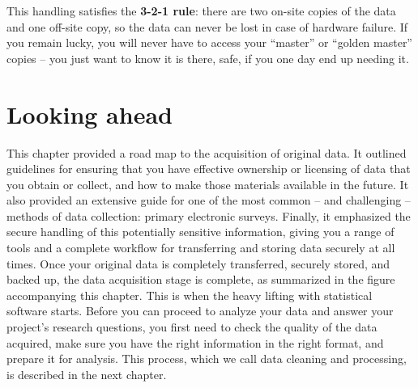 \noindent This handling satisfies the \textbf{3-2-1 rule}:
there are two on-site copies of the data and one off-site copy,
so the data can never be lost in case of hardware failure.
If you remain lucky, you will never have to access your ``master'' or ``golden master'' copies --
you just want to know it is there, safe, if you one day end up needing it.

\section{Looking ahead}

This chapter provided a road map to the acquisition of original data.
It outlined guidelines for ensuring that you have effective ownership
or licensing of data that you obtain or collect,
and how to make those materials available in the future.
It also provided an extensive guide for one of the most common --
and challenging --
methods of data collection: primary electronic surveys.
Finally, it emphasized the secure handling of this potentially sensitive information,
giving you a range of tools and a complete workflow
for transferring and storing data securely at all times.
Once your original data is completely transferred, securely stored, and backed up,
the data acquisition stage is complete, as
summarized in the figure accompanying this chapter.
This is when the heavy lifting with statistical software starts.
Before you can proceed to analyze your data
and answer your project's research questions,
you first need to check the quality of the data acquired,
make sure you have the right information in the right format, and prepare it for analysis.
This process, which we call data cleaning and processing,
is described in the next chapter.

